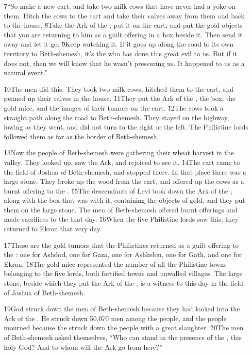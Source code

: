 \v{7}``So make a new cart, and take two milk cows that have never had a yoke on them. Hitch the cows to the cart and take their calves away from them and back to the house. \v{8}Take the Ark of the , put it on the cart, and put the gold objects that you are returning to him as a guilt offering in a box beside it. Then send it away and let it go. \v{9}Keep watching it. If it goes up along the road to its own territory to Beth-shemesh, it's the  who has done this great evil to us. But if it does not, then we will know that he wasn't pressuring us. It happened to us as a natural event.''

\v{10}The men did this. They took two milk cows, hitched them to the cart, and penned up their calves in the house. \v{11}They put the Ark of the , the box, the gold mice, and the images of their tumors on the cart. \v{12}The cows took a straight path along the road to Beth-shemesh. They stayed on the highway, lowing as they went, and did not turn to the right or the left. The Philistine lords followed them as far as the border of Beth-shemesh.

\v{13}Now the people of Beth-shemesh were gathering their wheat harvest in the valley. They looked up, saw the Ark, and rejoiced to see it. \v{14}The cart came to the field of Joshua of Beth-shemesh, and stopped there. In that place there was a large stone. They broke up the wood from the cart, and offered up the cows as a burnt offering to the . \v{15}The descendants of Levi took down the Ark of the , along with the box that was with it, containing the objects of gold, and they put them on the large stone. The men of Beth-shemesh offered burnt offerings and made sacrifices to the  that day. \v{16}When the five Philistine lords saw this, they returned to Ekron that very day.

\v{17}These are the gold tumors that the Philistines returned as a guilt offering to the : one for Ashdod, one for Gaza, one for Ashkelon, one for Gath, and one for Ekron. \v{18}The gold mice represented the number of all the Philistine towns belonging to the five lords, both fortified towns and unwalled villages. The large stone, beside which they put the Ark of the , is a witness to this day in the field of Joshua of Beth-shemesh.

\v{19}God struck down the men of Beth-shemesh because they had looked into the Ark of the . He struck down 50,070 men among the people, and the people mourned because the  struck down the people with a great slaughter. \v{20}The men of Beth-shemesh asked themselves, ``Who can stand in the presence of the , this holy God? And to whom will the Ark go from here?''

